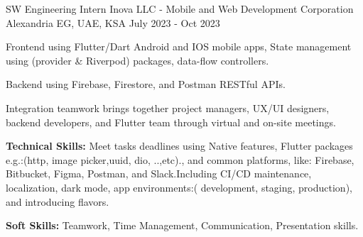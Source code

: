 

\begin{cventries}

  \cventry
    {SW Engineering Intern} %
    {Inova LLC - Mobile and Web Development Corporation} %
    {Alexandria EG, UAE, KSA} %
    {July 2023 - Oct 2023} %
    {
      \begin{cvitems} %
        \item {Frontend using Flutter/Dart Android and IOS mobile apps, State management using 
        (provider \& Riverpod) packages, data-flow controllers.}
        \item {Backend using Firebase, Firestore, and Postman RESTful APIs.}
        \item {Integration teamwork brings together project managers, UX/UI designers, backend developers, and Flutter team through virtual and on-site meetings.}
        \item {\textbf{Technical Skills:} Meet tasks deadlines using Native features, Flutter packages e.g.:(http, image picker,uuid, dio, ..,etc)., and common platforms, like: Firebase, Bitbucket, Figma, Postman, and Slack.Including CI/CD maintenance, localization, dark mode, app environments:( development, staging, production), and introducing flavors.}
        \item {\textbf{Soft Skills:} Teamwork, Time Management, Communication, Presentation skills.}
      \end{cvitems}
    }

\end{cventries}


